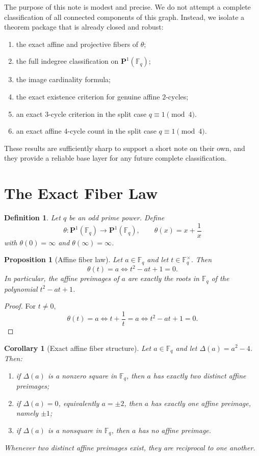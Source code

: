 \documentclass[11pt]{article}
\newtheorem{proposition}[theorem]{Proposition}
\newtheorem{corollary}[theorem]{Corollary}
\newtheorem{definition}[theorem]{Definition}
\newcommand{\F}{\mathbb{F}}
\newcommand{\Pone}{\mathbf{P}^1}
\begin{document}
The purpose of this note is modest and precise.
We do not attempt a complete classification of all connected components of this graph.
Instead, we isolate a theorem package that is already closed and robust:
\begin{enumerate}[label=\textup{(\roman*)}]
\item the exact affine and projective fibers of $\theta$;
\item the full indegree classification on $\Pone(\F_q)$;
\item the image cardinality formula;
\item the exact existence criterion for genuine affine $2$-cycles;
\item an exact $3$-cycle criterion in the split case $q\equiv 1\pmod4$.
\item an exact affine $4$-cycle count in the split case $q\equiv 1\pmod4$.
\end{enumerate}

These results are sufficiently sharp to support a short note on their own, and they provide a reliable base layer for any future complete classification.

\section{The Exact Fiber Law}

\begin{definition}
Let $q$ be an odd prime power.
Define
\[
\theta:\Pone(\F_q)\to\Pone(\F_q),\qquad \theta(x)=x+\frac1x
\]
with $\theta(0)=\infty$ and $\theta(\infty)=\infty$.
\end{definition}

\begin{proposition}[Affine fiber law]
\label{prop:affine-fiber}
Let $a\in\F_q$ and let $t\in\F_q^\times$.
Then
\[
\theta(t)=a\iff t^2-at+1=0.
\]
In particular, the affine preimages of $a$ are exactly the roots in $\F_q$ of the polynomial $t^2-at+1$.
\end{proposition}

\begin{proof}
For $t\neq 0$,
\[
\theta(t)=a
\iff
t+\frac1t=a
\iff
t^2-at+1=0.
\]
\end{proof}

\begin{corollary}[Exact affine fiber structure]
\label{cor:affine-fibers}
Let $a\in\F_q$ and let $\Delta(a)=a^2-4$.
Then:
\begin{enumerate}[label=\textup{(\roman*)}]
\item if $\Delta(a)$ is a nonzero square in $\F_q$, then $a$ has exactly two distinct affine preimages;
\item if $\Delta(a)=0$, equivalently $a=\pm 2$, then $a$ has exactly one affine preimage, namely $\pm 1$;
\item if $\Delta(a)$ is a nonsquare in $\F_q$, then $a$ has no affine preimage.
\end{enumerate}
Whenever two distinct affine preimages exist, they are reciprocal to one another.
\end{corollary}
\end{document}
